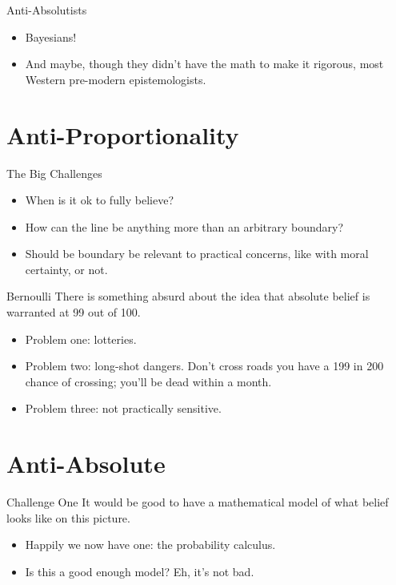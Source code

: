 \documentclass[
  17pt,
  letterpaper,
  ignorenonframetext,
  aspectratio=169,
  handout]{beamer}
\providecommand{\tightlist}{%
  \setlength{\itemsep}{0pt}\setlength{\parskip}{0pt}}\usepackage{longtable,booktabs,array}
\begin{document}
\begin{frame}{Anti-Absolutists}
\protect\hypertarget{anti-absolutists}{}
\begin{itemize}[<+->]
\tightlist
\item
  Bayesians!
\item
  And maybe, though they didn't have the math to make it rigorous, most
  Western pre-modern epistemologists.
\end{itemize}
\end{frame}

\hypertarget{anti-proportionality}{%
\section{Anti-Proportionality}\label{anti-proportionality}}

\begin{frame}{The Big Challenges}
\protect\hypertarget{the-big-challenges}{}
\begin{itemize}[<+->]
\tightlist
\item
  When is it ok to fully believe?
\item
  How can the line be anything more than an arbitrary boundary?
\item
  Should be boundary be relevant to practical concerns, like with moral
  certainty, or not.
\end{itemize}
\end{frame}

\begin{frame}{Bernoulli}
\protect\hypertarget{bernoulli}{}
There is something absurd about the idea that absolute belief is
warranted at 99 out of 100.

\begin{itemize}[<+->]
\tightlist
\item
  Problem one: lotteries.
\item
  Problem two: long-shot dangers. Don't cross roads you have a 199 in
  200 chance of crossing; you'll be dead within a month.
\item
  Problem three: not practically sensitive.
\end{itemize}
\end{frame}

\hypertarget{anti-absolute}{%
\section{Anti-Absolute}\label{anti-absolute}}

\begin{frame}{Challenge One}
\protect\hypertarget{challenge-one}{}
It would be good to have a mathematical model of what belief looks like
on this picture.

\begin{itemize}[<+->]
\tightlist
\item
  Happily we now have one: the probability calculus.
\item
  Is this a good enough model? Eh, it's not bad.
\end{itemize}
\end{frame}
\end{document}
